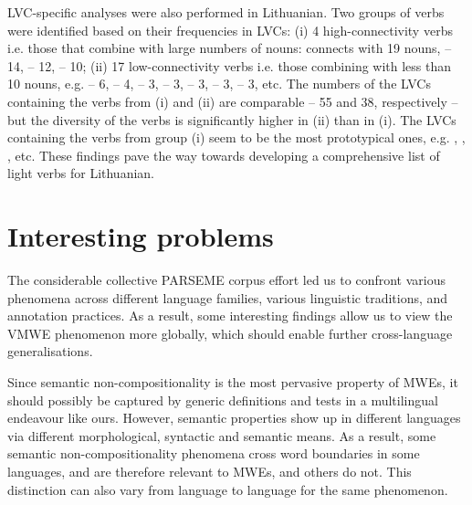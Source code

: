 \documentclass[output=paper,modfonts]{langscibook}
\begin{document}
LVC-specific analyses were also performed in Lithuanian. Two groups of verbs were identified based on their frequencies in LVCs: 
(i) 4 high-connectivity verbs i.e. those that combine with large numbers of nouns:   connects with 19 nouns,  -- 14,  -- 12,  -- 10; 
(ii) 17 low-connectivity verbs i.e. those combining with less than 10 nouns, e.g.  -- 6,  -- 4,  -- 3,  -- 3,  -- 3,   -- 3,  -- 3, etc. 
The numbers of the LVCs containing the verbs from (i) and (ii) are comparable -- 55 and 38, respectively -- but the diversity of the verbs is significantly higher in (ii) than in (i). 
The LVCs containing the verbs from group (i) seem to be the most prototypical ones, e.g. , , , etc. These findings pave the way towards developing a comprehensive list of light verbs for Lithuanian.

\section{Interesting problems}
\label{sec:findings}
%
The considerable collective PARSEME corpus effort led us to confront various phenomena across different language families, various linguistic traditions, and annotation practices. As a result, some interesting findings allow us to view the VMWE phenomenon more globally, which should enable further cross-language generalisations. 

Since semantic non-compositionality is the most pervasive property of MWEs, it should possibly be captured by generic definitions and tests in a multilingual endeavour like ours. However, semantic properties show up in different languages via different morphological, syntactic and semantic means. As a result, some semantic non-compositionality phenomena cross word boundaries in some languages, and are therefore relevant to MWEs, and others do not. This distinction can also vary from language to language for the same phenomenon.
\end{document}

